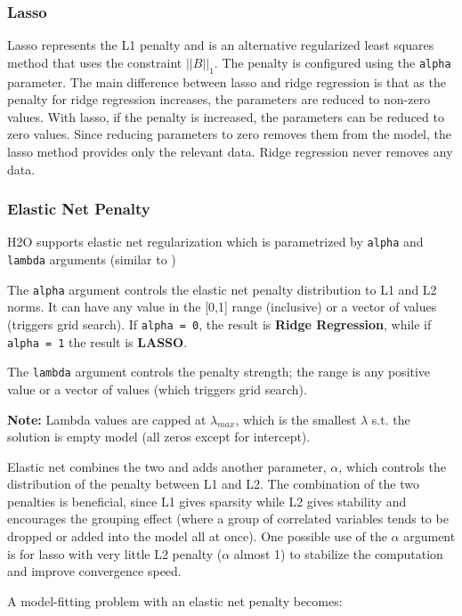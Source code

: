 \subsubsection{Lasso}

Lasso represents the L1 penalty and is an alternative regularized least squares method that uses the constraint $||B||_1$. The penalty is configured using the \texttt{alpha} parameter. The main difference between lasso and ridge regression is that as the penalty for ridge regression increases, the parameters are reduced to non-zero values. With lasso, if the penalty is increased, the parameters can be reduced to zero values. Since reducing parameters to zero removes them from the model, the lasso method provides only the relevant data. Ridge regression never removes any data. 

\subsubsection{Elastic Net Penalty}

H2O supports elastic net regularization which is parametrized by \texttt{alpha} and \texttt{lambda} arguments (similar to )

The \texttt{alpha} argument controls the elastic net penalty distribution to L1 and L2 norms. It can have any value in the [0,1] range (inclusive) or a vector of values (triggers grid search). If \texttt{alpha = 0}, the result is \textbf{Ridge Regression}, while if \texttt{alpha = 1} the result is \textbf{LASSO}.  

The \texttt{lambda} argument controls the penalty strength; the range is any positive value or a vector of values (which triggers grid search).

\textbf{Note:} Lambda values are capped at $\lambda_{max}$, which is the smallest $\lambda$ s.t. the solution is empty model (all zeros except for intercept).

Elastic net combines the two and adds another parameter, $\alpha$, which controls the distribution of the penalty between L1 and L2. The combination of the two penalties is beneficial, since L1 gives sparsity while L2 gives stability and encourages the grouping effect (where a group of correlated variables tends to be dropped or added into the model all at once). One possible use of the $\alpha$ argument is for lasso with very little L2 penalty ($\alpha$ almost 1) to stabilize the computation and improve convergence speed. 

A model-fitting problem with an elastic net penalty becomes:

